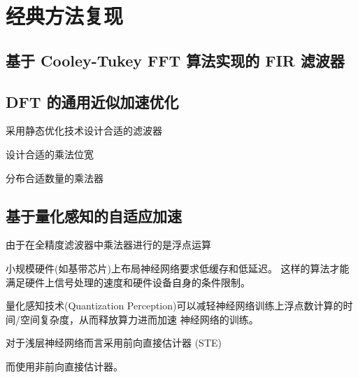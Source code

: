 \section{经典方法复现}

\subsection{基于 Cooley-Tukey FFT 算法实现的 FIR 滤波器}

\subsection{DFT 的通用近似加速优化}

采用静态优化技术设计合适的滤波器

设计合适的乘法位宽


分布合适数量的乘法器

\subsection{基于量化感知的自适应加速}

由于在全精度滤波器中乘法器进行的是浮点运算

小规模硬件(如基带芯片)上布局神经网络要求低缓存和低延迟。
这样的算法才能满足硬件上信号处理的速度和硬件设备自身的条件限制。

量化感知技术(Quantization Perception)可以减轻神经网络训练上浮点数计算的时间/空间复杂度，从而释放算力进而加速
神经网络的训练。

对于浅层神经网络而言采用前向直接估计器 (STE)

而使用非前向直接估计器。

